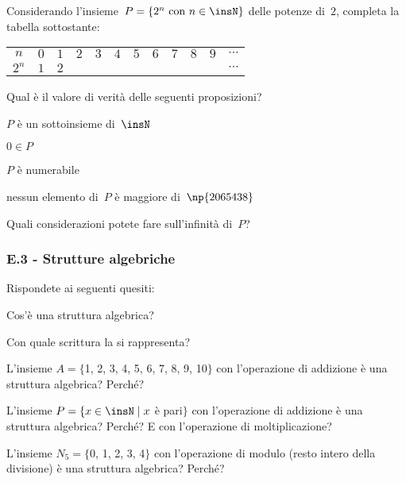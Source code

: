 \begin{esercizio}
\label{ese:E.16}

Considerando l'insieme~$P=\left\{2^{n}\text{ con }n\in \insN\right\}$ delle potenze di~$2$,
completa la tabella sottostante:
\begin{center}
 \begin{tabular}{cccccccccccc}
  \toprule
  $n$ & $0$ & $1$ & $2$ & $3$ & $4$ & $5$ & $6$ & $7$ & $8$ & $9$ & $\cdots$\\
  $2^n$ & $1$ & $2$ & & & & & & & & & $\cdots$ \\
  \bottomrule
 \end{tabular}
\end{center}

Qual è il valore di verità delle seguenti proposizioni?
\begin{enumeratea}
\TabPositions{8cm}
\item $P$ è un sottoinsieme di~$\insN$ \tab\boxV\quad\boxF
\item $0 \in P$ \tab\boxV\quad\boxF
\item $P$ è numerabile \tab\boxV\quad\boxF
\item nessun elemento di~$P$ è maggiore di~$\np{2065438}$\tab\boxV\quad\boxF
\end{enumeratea}

Quali considerazioni potete fare sull'infinità di~$P$?
\end{esercizio}

\subsubsection*{E.3 - Strutture algebriche}

\begin{esercizio}
\label{ese:E.17}
Rispondete ai seguenti quesiti:
\begin{enumeratea}
\item Cos'è una struttura algebrica?
\item Con quale scrittura la si rappresenta?
\item L'insieme $A=\{$1, 2, 3, 4, 5, 6, 7, 8, 9, 10$\}$ con l'operazione di addizione è una struttura algebrica? Perché?
\item L'insieme $P=\{x\in\insN\mid x$ è pari$\}$ con l'operazione di addizione è una struttura algebrica? Perché? E con l'operazione di moltiplicazione?
\item L'insieme $N_5=\{$0, 1, 2, 3, 4$\}$ con l'operazione di modulo (resto intero della divisione) è una struttura algebrica? Perché?
\end{enumeratea}
\end{esercizio}

